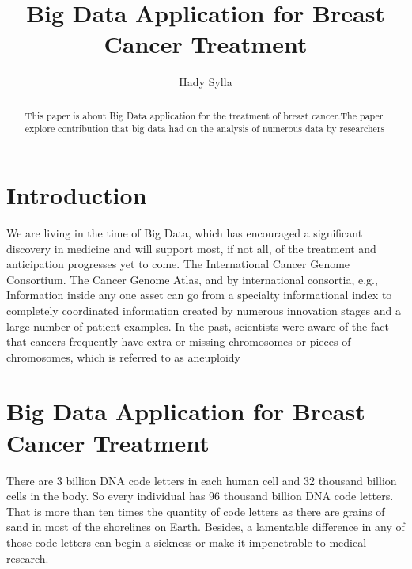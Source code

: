 \documentclass[sigconf]{acmart}
\begin{document}
\title{Big Data Application for Breast Cancer Treatment}


\author{Hady Sylla}


\renewcommand{\shortauthors}{G. v. Laszewski}


\begin{abstract}
This paper is about Big Data application for the treatment of breast cancer.The paper explore contribution that big data had on the analysis of numerous data by researchers
\end{abstract}




\maketitle


\section{Introduction}

We are living in the time of Big Data, which has encouraged a significant discovery in medicine and will support most, if not all, of the treatment and anticipation progresses yet to come\cite{murdoch2013inevitable}.  The International Cancer Genome Consortium.  The Cancer Genome Atlas, and by international consortia, e.g., Information inside any one asset can go from a specialty informational index to completely coordinated information created by numerous innovation stages and a large number of patient examples\cite{murdoch2013inevitable}.  In the past, scientists were aware of the fact that cancers frequently have extra or missing chromosomes or pieces of chromosomes, which is referred to as aneuploidy 

\section{Big Data Application for Breast Cancer Treatment}

\setlength{\parskip}{1em}
\renewcommand{\baselinestretch}{2.0}

There are 3 billion DNA code letters in each human cell and 32 thousand billion cells in the body. So every individual has 96 thousand billion DNA code letters\cite{marchini2004}. That is more than ten times the quantity of code letters as there are grains of sand in most of the shorelines on Earth. Besides, a lamentable difference in any of those code letters can begin a sickness or make it impenetrable to medical research\cite{marchini2004}.
\end{document}
